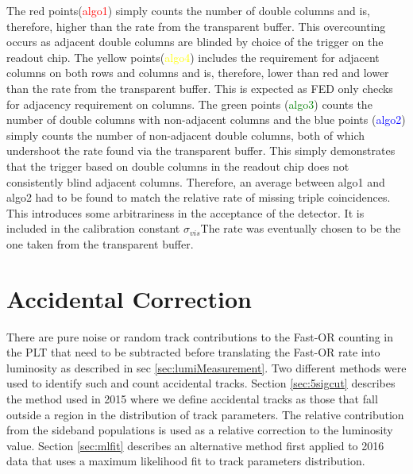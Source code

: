 The red points(\textcolor{red}{algo1}) simply counts the number of double columns and is, therefore, higher than the rate from the transparent buffer. This overcounting occurs as adjacent double columns are blinded by choice of the trigger on the readout chip.
The yellow points(\textcolor{yellow}{algo4}) includes the requirement for adjacent columns on both rows and columns and is, therefore, lower than red and lower than the rate from the transparent buffer. This is expected as FED only checks for adjacency requirement on columns.  The green points (\textcolor{green}{algo3}) counts the number of double columns with non-adjacent columns and the blue points (\textcolor{blue}{algo2}) simply counts the number of non-adjacent double columns, both of which undershoot the rate found via the transparent buffer. This simply demonstrates that the trigger based on double columns in the readout chip does not consistently blind adjacent columns. Therefore, an average between algo1 and algo2 had to be found to match the relative rate of missing triple coincidences. This introduces some arbitrariness in the acceptance of the detector. It is included in the calibration constant $\sigma_{vis}$The rate was eventually chosen to be the one taken from the transparent buffer.








\section{Accidental Correction}


There are pure noise or random track contributions to the Fast-OR counting in the PLT that need to be subtracted before translating the Fast-OR rate into luminosity as described in sec \ref{sec:lumiMeasurement}. Two different methods were used to identify such and count accidental tracks. 
Section \ref{sec:5sigcut} describes the method used in 2015 where we define accidental tracks as those that fall outside a region in the distribution of track parameters. 
The relative contribution from the sideband populations is used as a relative correction to the luminosity value. 
Section \ref{sec:mlfit} describes an alternative method first applied to 2016 data that uses a maximum likelihood fit to track parameters distribution. 



